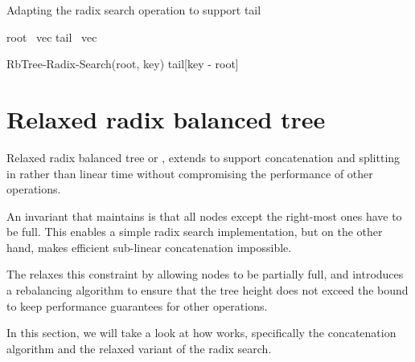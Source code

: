 \begin{listing}[ht!]
    \caption{Adapting the radix search operation to support tail}
    \label{lst:pvec-radix-search}

    \begin{algorithmic}

        \State root \la\ vec
        \State tail \la\ vec

            \State \Return RbTree-Radix-Search(root, key)
        \Else
            \State \Return tail[key - root]
        \EndIf
        \EndFunction
    \end{algorithmic}
\end{listing}

\section{Relaxed radix balanced tree}
Relaxed radix balanced tree or \treerrb{}, extends \treerb{} to support concatenation and splitting in  rather than linear time without compromising the performance of other operations.

An invariant that \treerb{} maintains is that all nodes except the right-most ones have to be full. This enables a simple radix search implementation, but on the other hand, makes efficient sub-linear concatenation impossible.

The \treerrb{} relaxes this constraint by allowing nodes to be partially full, and introduces a rebalancing algorithm to ensure that the tree height does not exceed the  bound to keep performance guarantees for other operations.

In this section, we will take a look at how \treerrb{} works, specifically the concatenation algorithm and the relaxed variant of the radix search.



